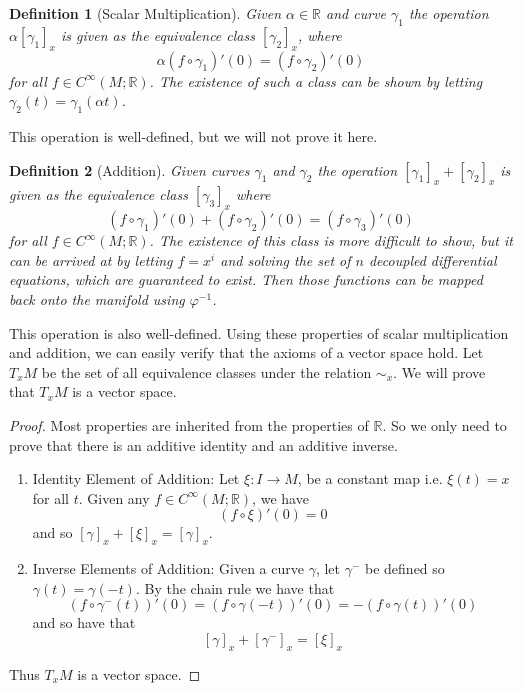\documentclass[a4paper]{article}
\newtheorem*{defn}{Definition}
\begin{document}
\begin{defn}[Scalar Multiplication]
  Given $\alpha \in \mathds{R}$ and curve $\gamma_1$ the operation $\alpha [\gamma_1]_x$ is given as the equivalence class $[\gamma_2]_x$, where
  \[
    \alpha (f \circ \gamma_1)'(0) =  (f \circ \gamma_2)'(0)
  \]
  for all $f \in C^\infty(M; \mathds{R})$. The existence of such a class can be shown by letting $\gamma_2(t) = \gamma_1(\alpha t)$.
\end{defn}

This operation is well-defined, but we will not prove it here.

\begin{defn}[Addition]
  Given curves $\gamma_1$ and $\gamma_2$ the operation $[\gamma_1]_x + [\gamma_2]_x$ is given as the equivalence class $[\gamma_3]_x$ where
  \[
    (f \circ \gamma_1)'(0) + (f \circ \gamma_2)'(0) = (f \circ \gamma_3)'(0)
  \]
  for all $f \in C^\infty(M; \mathds{R})$. The existence of this class is more difficult to show, but it can be arrived at by letting $f = x^i$ and solving the set of $n$ decoupled differential equations, which are guaranteed to exist. Then those functions can be mapped back onto the manifold using $\varphi^{-1}$.
\end{defn}

This operation is also well-defined. Using these properties of scalar multiplication and addition, we can easily verify that the axioms of a vector space hold. Let $T_xM$ be the set of all equivalence classes under the relation $\sim_x$. We will prove that $T_xM$ is a vector space.

\begin{proof}
  Most properties are inherited from the properties of $\mathds{R}$. So we only need to prove that there is an additive identity and an additive inverse.
  \begin{enumerate}
    \item Identity Element of Addition: Let $\xi: I \rightarrow M$, be a constant map i.e. $\xi(t) = x$ for all $t$. Given any $f \in C^\infty(M; \mathds{R})$, we have
      \[
        (f \circ \xi)'(0) = 0
      \]
      and so $[\gamma]_x + [\xi]_x = [\gamma]_x$.
    \item Inverse Elements of Addition: Given a curve $\gamma$, let $\gamma^-$ be defined so $\gamma(t) = \gamma(-t)$. By the chain rule we have that
      \[
        (f \circ \gamma^-(t))'(0) = (f \circ \gamma(-t))'(0) = -(f \circ \gamma(t))'(0)
      \]
      and so have that
      \[
        \left[ \gamma \right]_x + \left[ \gamma^- \right]_x = \left[ \xi \right]_x
      \]
  \end{enumerate}
  Thus $T_xM$ is a vector space.
\end{proof}
\end{document}

